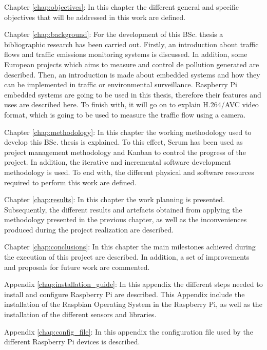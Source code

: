 \begin{definitionlist}
	\item[Chapter \ref{chap:objectives}: \nameref{chap:objectives}] In this chapter the different general and specific objectives that will be addressed in this work are defined.
	
	\item[Chapter \ref{chap:background}: \nameref{chap:background}] For the development of this \ac{BSc.} thesis a bibliographic research has been carried out. Firstly, an introduction about traffic flows and traffic emissions monitoring systems is discussed. In addition, some European projects which aims to measure and control de pollution generated are described. Then, an introduction is made about embedded systems and how they can be implemented in traffic or environmental surveillance. Raspberry Pi embedded systems are going to be used in this thesis, therefore their features and uses are described here. To finish with, it will go on to explain H.264/AVC video format, which is going to be used to measure the traffic flow using a camera.
	
	\item[Chapter \ref{chap:methodology}: \nameref{chap:methodology}] In this chapter the working methodology used to develop this \ac{BSc.} thesis is explained. To this effect, Scrum has been used as project management methodology and Kanban to control the progress of the project. In addition, the iterative and incremental software development methodology is used. To end with, the different physical and software resources required to perform this work are defined.
	
	\item[Chapter \ref{chap:results}: \nameref{chap:results}] In this chapter the work planning is presented. Subsequently, the different results and artefacts obtained from applying the methodology presented in the previous chapter, as well as the inconveniences produced during the project realization are described. 
	
	\item[Chapter \ref{chap:conclusions}: \nameref{chap:conclusions}] In this chapter the main milestones achieved during the execution of this project are described. In addition, a set of improvements and proposals for future work are commented. 
	
	\item[Appendix \ref{chap:installation_guide}: \nameref{chap:installation_guide}] In this appendix the different steps needed to install and configure Raspberry Pi are described. This Appendix include the installation of the Raspbian Operating System in the Raspberry Pi, as well as the installation of the different sensors and libraries.
	
	\item[Appendix \ref{chap:config_file}: \nameref{chap:config_file}] In this appendix the configuration file used by the different Raspberry Pi devices is described.
\end{definitionlist}



